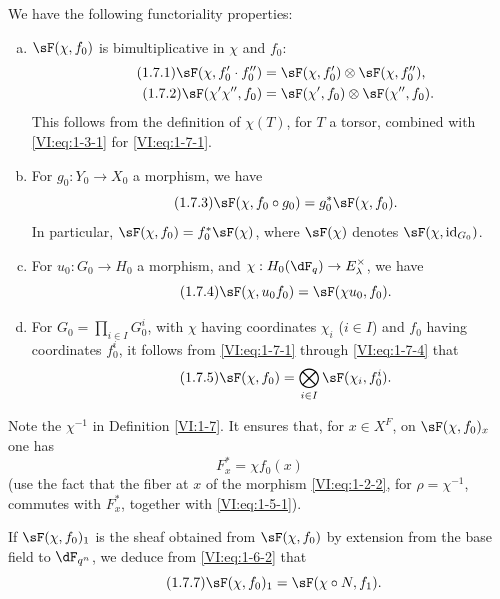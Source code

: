 \documentclass[oneside]{book}
\begin{document}
We have the following functoriality properties:
\begin{enumerate}[a)]
  \item $\sF(\chi,f_0)$ is bimultiplicative in $\chi$ and $f_0$: 
    \begin{align*}\tag{1.7.1}\label{VI:eq:1-7-1}
      \sF(\chi,f_0'\cdot f_0'') &= \sF(\chi,f_0')\otimes \sF(\chi,f_0'') \text{,} \\
      \tag{1.7.2}\label{VI:eq:1-7-2}
      \sF(\chi'\chi'',f_0) &= \sF(\chi',f_0)\otimes \sF(\chi'',f_0) \text{.}
    \end{align*}
    This follows from the definition of $\chi(T)$, for $T$ a torsor, combined 
    with \eqref{VI:eq:1-3-1} for \eqref{VI:eq:1-7-1}. 
  \item For $g_0:Y_0\to X_0$ a morphism, we have 
    \begin{equation*}\tag{1.7.3}\label{VI:eq:1-7-3}
      \sF(\chi,f_0\circ g_0) = g_0^\ast \sF(\chi,f_0) \text{.}
    \end{equation*}
    In particular, $\sF(\chi,f_0) = f_0^\ast \sF(\chi)$, where $\sF(\chi)$ 
    denotes $\sF(\chi,\operatorname{id}_{G_0})$. 
  \item For $u_0:G_0\to H_0$ a morphism, and 
    $\chi:H_0(\dF_q) \to E_\lambda^\times$, we have 
    \begin{equation*}\tag{1.7.4}\label{VI:eq:1-7-4}
      \sF(\chi,u_0 f_0) = \sF(\chi u_0,f_0) \text{.}
    \end{equation*}
  \item For $G_0=\prod_{i\in I} G_0^i$, with $\chi$ having coordinates $\chi_i$ 
    ($i\in I$) and $f_0$ having coordinates $f_0^i$, it follows from 
    \eqref{VI:eq:1-7-1} through \eqref{VI:eq:1-7-4} that 
    \begin{equation*}\tag{1.7.5}\label{VI:eq:1-7-5}
      \sF(\chi,f_0) = \bigotimes_{i\in I} \sF(\chi_i,f_0^i) \text{.}
    \end{equation*}    
\end{enumerate}

Note the $\chi^{-1}$ in Definition \ref{VI:1-7}. It ensures that, for 
$x\in X^F$, on $\sF(\chi,f_0)_x$ one has 
\begin{equation*}\tag{1.7.6}\label{VI:eq:1-7-6}
  F_x^\ast = \chi f_0(x)
\end{equation*}
(use the fact that the fiber at $x$ of the morphism \eqref{VI:eq:1-2-2}, for 
$\rho=\chi^{-1}$, commutes with $F_x^\ast$, together with \eqref{VI:eq:1-5-1}). 

If $\sF(\chi,f_0)_1$ is the sheaf obtained from $\sF(\chi,f_0)$ by extension 
from the base field to $\dF_{q^n}$, we deduce from \eqref{VI:eq:1-6-2} that 
\begin{equation*}\tag{1.7.7}\label{VI:eq:1-7-7}
  \sF(\chi,f_0)_1 = \sF(\chi\circ N,f_1) \text{.}
\end{equation*}
\end{document}
